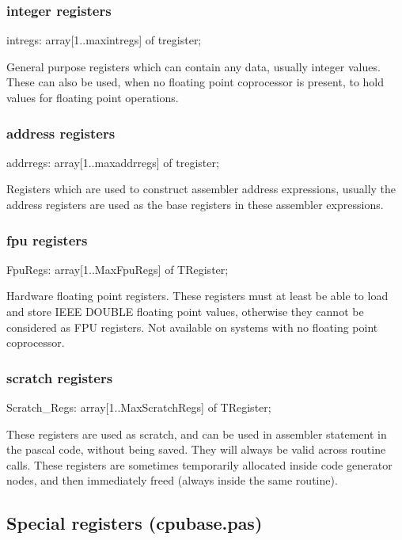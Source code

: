 \documentclass [a4paper,12pt]{article}
\begin{document}
\subsubsection{integer registers}
\label{subsubsec:integer}

\textsf{intregs: array[1..maxintregs] of tregister;}

General purpose registers which can contain any data, usually integer
values. These can also be used, when no floating point coprocessor is
present, to hold values for floating point operations.

\subsubsection{address registers}
\label{subsubsec:address}

\textsf{addrregs: array[1..maxaddrregs] of tregister;}

Registers which are used to construct assembler address expressions, usually
the address registers are used as the base registers in these assembler
expressions.

\subsubsection{fpu registers}
\label{subsubsec:mylabel25}

\textsf{FpuRegs: array[1..MaxFpuRegs] of TRegister;}

Hardware floating point registers. These registers must at least be able to
load and store IEEE DOUBLE floating point values, otherwise they cannot be
considered as FPU registers. Not available on systems with no floating point
coprocessor.

\subsubsection{scratch registers}
\label{subsubsec:scratch}

\textsf{Scratch{\_}Regs: array[1..MaxScratchRegs] of TRegister;}

These registers are used as scratch, and can be used in assembler statement
in the pascal code, without being saved. They will always be valid across
routine calls. These registers are sometimes temporarily allocated inside
code generator nodes, and then immediately freed (always inside the same
routine).

\subsection{Special registers (cpubase.pas)}
\label{subsec:special}
\end{document}
